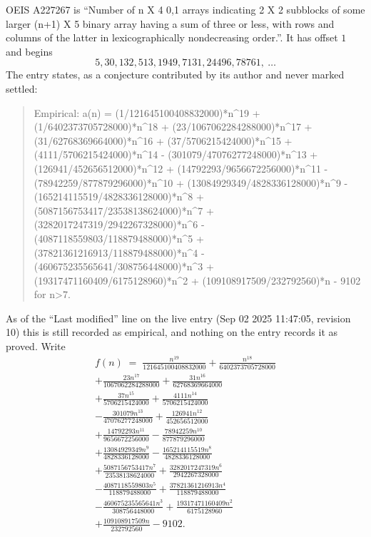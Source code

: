 \documentclass[11pt,a4paper]{article}
\theoremstyle{plain}
\theoremstyle{definition}
\begin{document}
OEIS A227267 is ``Number of n X 4 0,1 arrays indicating 2 X 2 subblocks of some larger (n+1) X 5 binary array having a sum of three or less, with rows and columns of the latter in lexicographically nondecreasing order.''. It has offset $1$ and begins
\[
5, 30, 132, 513, 1949, 7131, 24496, 78761,\ \dots
\]
The entry states, as a conjecture contributed by its author and never marked settled:
\begin{quote}\raggedright\small
Empirical: a(n) = (1/121645100408832000)*n\^{}19 + (1/6402373705728000)*n\^{}18 + (23/1067062284288000)*n\^{}17 + (31/62768369664000)*n\^{}16 + (37/5706215424000)*n\^{}15 + (4111/5706215424000)*n\^{}14 - (301079/47076277248000)*n\^{}13 + (126941/452656512000)*n\^{}12 + (14792293/9656672256000)*n\^{}11 - (78942259/877879296000)*n\^{}10 + (13084929349/4828336128000)*n\^{}9 - (165214115519/4828336128000)*n\^{}8 + (5087156753417/23538138624000)*n\^{}7 + (3282017247319/2942267328000)*n\^{}6 - (4087118559803/118879488000)*n\^{}5 + (37821361216913/118879488000)*n\^{}4 - (460675235565641/308756448000)*n\^{}3 + (19317471160409/6175128960)*n\^{}2 + (109108917509/232792560)*n - 9102 for n>7.
\end{quote}
As of the ``Last modified'' line on the live entry (Sep 02 2025 11:47:05, revision 10) this is still
recorded as empirical, and nothing on the entry records it as proved. Write
\begin{multline*}
f(n)\;=\;\frac{n^{19}}{121645100408832000} + \frac{n^{18}}{6402373705728000} \\
+ \frac{23 n^{17}}{1067062284288000} + \frac{31 n^{16}}{62768369664000} \\
+ \frac{37 n^{15}}{5706215424000} + \frac{4111 n^{14}}{5706215424000} \\
- \frac{301079 n^{13}}{47076277248000} + \frac{126941 n^{12}}{452656512000} \\
+ \frac{14792293 n^{11}}{9656672256000} - \frac{78942259 n^{10}}{877879296000} \\
+ \frac{13084929349 n^{9}}{4828336128000} - \frac{165214115519 n^{8}}{4828336128000} \\
+ \frac{5087156753417 n^{7}}{23538138624000} + \frac{3282017247319 n^{6}}{2942267328000} \\
- \frac{4087118559803 n^{5}}{118879488000} + \frac{37821361216913 n^{4}}{118879488000} \\
- \frac{460675235565641 n^{3}}{308756448000} + \frac{19317471160409 n^{2}}{6175128960} \\
+ \frac{109108917509 n}{232792560} - 9102.
\end{multline*}
\end{document}
